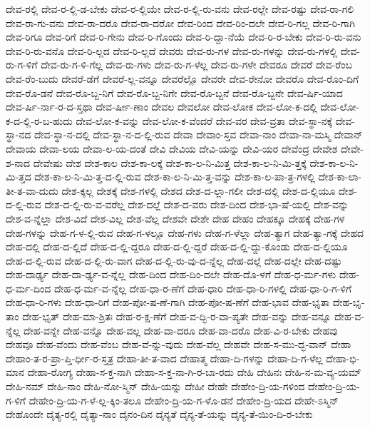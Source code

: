 {ದೇವ-ರಲ್ಲಿ
ದೇವ-ರ-ಲ್ಲಿ-ಡ-ಬೇಕು
ದೇವ-ರ-ಲ್ಲಿಯೇ
ದೇವ-ರ-ಲ್ಲಿ-ರು-ವನು
ದೇವ-ರಲ್ಲೇ
ದೇವ-ರಷ್ಟು
ದೇವ-ರಾ-ಗಲಿ
ದೇವ-ರಾ-ಗು-ವನು
ದೇವ-ರಾ-ದರೊ
ದೇವ-ರಾ-ದರೋ
ದೇವ-ರಿಂದ
ದೇವ-ರಿಂ-ದಲೇ
ದೇವ-ರಿ-ಗಲ್ಲ
ದೇವ-ರಿ-ಗಾಗಿ
ದೇವ-ರಿಗೂ
ದೇವ-ರಿಗೆ
ದೇವ-ರಿ-ಗೇನು
ದೇವ-ರಿ-ಗೊಂದು
ದೇವ-ರಿ-ದ್ದಾ-ನೆಯೆ
ದೇವ-ರಿ-ರ-ಬೇಕು
ದೇವ-ರಿ-ರು-ವನು
ದೇವ-ರಿ-ರು-ವನೊ
ದೇವ-ರಿ-ಲ್ಲದ
ದೇವ-ರಿ-ಲ್ಲದೆ
ದೇವರು
ದೇವ-ರು-ಗಳ
ದೇವ-ರು-ಗಳನ್ನು
ದೇವ-ರು-ಗಳಲ್ಲಿ
ದೇವ-ರು-ಗ-ಳಿಗೆ
ದೇವ-ರು-ಗ-ಳಿ-ಗೆಲ್ಲ
ದೇವ-ರು-ಗಳು
ದೇವ-ರು-ಗ-ಳೆಲ್ಲ
ದೇವ-ರು-ಗಳೇ
ದೇವರೂ
ದೇವರೆ
ದೇವ-ರೆಂಬ
ದೇವ-ರೆಂ-ಬುದು
ದೇವರೆ-ಡೆಗೆ
ದೇವರೆ-ಲ್ಲ-ವನ್ನೂ
ದೇವರೆಲ್ಲೊ
ದೇವರೇ
ದೇವ-ರೇನೋ
ದೇವರೊ
ದೇವ-ರೊಂ-ದಿಗೆ
ದೇವ-ರೊ-ಡನೆ
ದೇವ-ರೊ-ಬ್ಬ-ನಿಗೆ
ದೇವ-ರೊ-ಬ್ಬ-ನಿಗೇ
ದೇವ-ರೊ-ಬ್ಬನೆ
ದೇವ-ರೊ-ಬ್ಬನೇ
ದೇವ-ರ್ಷಿ-ಯಾದ
ದೇವ-ರ್ಷಿ-ರ್ನಾ-ರ-ದ-ಸ್ತಥಾ
ದೇವ-ರ್ಷೀ-ಣಾಂ
ದೇವಲ
ದೇವಲೋ
ದೇವ-ಲೋಕ
ದೇವ-ಲೋ-ಕ-ದಲ್ಲಿ
ದೇವ-ಲೋ-ಕ-ದ-ಲ್ಲಿ-ರ-ಬ-ಹುದು
ದೇವ-ಲೋ-ಕ-ವನ್ನು
ದೇವ-ಲೋ-ಕ-ವೆಂದರೆ
ದೇವ-ವರ
ದೇವ-ವ್ರತಾ
ದೇವ-ಸ್ಥಾ-ನಕ್ಕೆ
ದೇವ-ಸ್ಥಾ-ನದ
ದೇವ-ಸ್ಥಾ-ನ-ದಲ್ಲಿ
ದೇವ-ಸ್ಥಾ-ನ-ದ-ಲ್ಲಿ-ರುವ
ದೇವಾ
ದೇವಾಂ-ಸ್ತವ
ದೇವಾ-ನಾಂ
ದೇವಾ-ನಾ-ಮಸ್ಮಿ
ದೇವಾನ್
ದೇವಾಯ
ದೇವಾ-ಲಯ
ದೇವಾ-ಲ-ಯ-ದಂತೆ
ದೇವಿ
ದೇವಿಯ
ದೇವಿ-ಯನ್ನು
ದೇವಿ-ಯರ
ದೇವೆಂದ್ರ
ದೇವೇಶ
ದೇವೇ-ಶ-ನಾದ
ದೇವೇಷು
ದೇಶ
ದೇಶ-ಕಾಲ
ದೇಶ-ಕಾ-ಲಕ್ಕೆ
ದೇಶ-ಕಾ-ಲ-ನಿ-ಮಿತ್ತ
ದೇಶ-ಕಾ-ಲ-ನಿ-ಮಿ-ತ್ತಕ್ಕೆ
ದೇಶ-ಕಾ-ಲ-ನಿ-ಮಿ-ತ್ತದ
ದೇಶ-ಕಾ-ಲ-ನಿ-ಮಿ-ತ್ತ-ದ-ಲ್ಲಿ-ರುವ
ದೇಶ-ಕಾ-ಲ-ನಿ-ಮಿ-ತ್ತ-ವನ್ನು
ದೇಶ-ಕಾ-ಲ-ಪಾ-ತ್ರ-ಗಳಲ್ಲಿ
ದೇಶ-ಕಾ-ಲಾ-ತೀ-ತ-ವಾ-ದುದು
ದೇಶ-ಕ್ಕಲ್ಲ
ದೇಶಕ್ಕೆ
ದೇಶ-ಗಳಲ್ಲಿ
ದೇಶದ
ದೇಶ-ದ-ಲ್ಲಾ-ಗಲೀ
ದೇಶ-ದಲ್ಲಿ
ದೇಶ-ದ-ಲ್ಲಿಯೂ
ದೇಶ-ದ-ಲ್ಲಿ-ರುವ
ದೇಶ-ದ-ಲ್ಲಿ-ರು-ವ-ವರೆಲ್ಲ
ದೇಶ-ದಲ್ಲೆ
ದೇಶ-ದ-ವರು
ದೇಶ-ದಿಂದ
ದೇಶ-ಭಾ-ಷೆ-ಯಲ್ಲಿ
ದೇಶ-ವನ್ನು
ದೇಶ-ವ-ನ್ನೆಲ್ಲಾ
ದೇಶ-ವಿದೆ
ದೇಶ-ವಿಲ್ಲ
ದೇಶ-ವೆಲ್ಲ
ದೇಶವೇ
ದೇಶೇ
ದೇಹ
ದೇಹಂ
ದೇಹಕ್ಕೂ
ದೇಹಕ್ಕೆ
ದೇಹ-ಗಳ
ದೇಹ-ಗಳನ್ನು
ದೇಹ-ಗ-ಳ-ಲ್ಲಿ-ರುವ
ದೇಹ-ಗ-ಳಲ್ಲೂ
ದೇಹ-ಗಳು
ದೇಹ-ಗ-ಳೆಲ್ಲಾ
ದೇಹ-ತ್ಯಾಗ
ದೇಹ-ತ್ಯಾ-ಗಕ್ಕೆ
ದೇಹದ
ದೇಹ-ದಲ್ಲಿ
ದೇಹ-ದ-ಲ್ಲಿದೆ
ದೇಹ-ದ-ಲ್ಲಿ-ದ್ದರೂ
ದೇಹ-ದ-ಲ್ಲಿ-ದ್ದರೆ
ದೇಹ-ದ-ಲ್ಲಿ-ದ್ದು-ಕೊಂಡು
ದೇಹ-ದ-ಲ್ಲಿಯೂ
ದೇಹ-ದ-ಲ್ಲಿ-ರುವ
ದೇಹ-ದ-ಲ್ಲಿ-ರು-ವಾಗ
ದೇಹ-ದ-ಲ್ಲಿ-ರು-ವು-ದ-ನ್ನೆಲ್ಲ
ದೇಹ-ದಲ್ಲೆ
ದೇಹ-ದಲ್ಲೇ
ದೇಹ-ದಷ್ಟು
ದೇಹ-ದಾರ್ಢ್ಯ
ದೇಹ-ದಾ-ರ್ಢ್ಯ-ವ-ನ್ನೆಲ್ಲ
ದೇಹ-ದಿಂದ
ದೇಹ-ದಿಂ-ದಲೇ
ದೇಹ-ದೊ-ಳಗೆ
ದೇಹ-ಧ-ರ್ಮ-ಗಳು
ದೇಹ-ಧ-ರ್ಮ-ದಿಂದ
ದೇಹ-ಧ-ರ್ಮ-ವ-ನ್ನೆಲ್ಲ
ದೇಹ-ಧಾ-ರ-ಣೆಗೆ
ದೇಹ-ಧಾರಿ
ದೇಹ-ಧಾ-ರಿ-ಗಳಲ್ಲಿ
ದೇಹ-ಧಾ-ರಿ-ಗ-ಳಿಗೆ
ದೇಹ-ಧಾ-ರಿ-ಗಳು
ದೇಹ-ಧಾ-ರಿಗೆ
ದೇಹ-ಪೋ-ಷ-ಣೆ-ಗಾಗಿ
ದೇಹ-ಪೋ-ಷ-ಣೆಗೆ
ದೇಹ-ಭಾವ
ದೇಹ-ಭೃತಾ
ದೇಹ-ಭೃ-ತಾಂ
ದೇಹ-ಭೃತ್
ದೇಹ-ಮಾ-ಶ್ರಿತಃ
ದೇಹ-ರ-ಕ್ಷ-ಣೆಗೆ
ದೇಹ-ವ-ದ್ಭಿ-ರ-ವಾ-ಪ್ಯತೇ
ದೇಹ-ವನ್ನು
ದೇಹ-ವನ್ನೂ
ದೇಹ-ವ-ನ್ನೆಲ್ಲ
ದೇಹ-ವನ್ನೇ
ದೇಹ-ವನ್ನೊ
ದೇಹ-ವಲ್ಲ
ದೇಹ-ವಾ-ದರೂ
ದೇಹ-ವಾ-ದರೊ
ದೇಹ-ವಿ-ರ-ಬೇಕು
ದೇಹವು
ದೇಹವೂ
ದೇಹ-ವೆಂದು
ದೇಹ-ವೆಂಬ
ದೇಹ-ವೆ-ನ್ನು-ವುದು
ದೇಹ-ವೆಲ್ಲ
ದೇಹವೇ
ದೇಹ-ಸ-ಮು-ದ್ಭ-ವಾನ್
ದೇಹಾ
ದೇಹಾಂ-ತ-ರ-ಪ್ರಾ-ಪ್ತಿ-ರ್ಧೀ-ರ-ಸ್ತತ್ರ
ದೇಹಾ-ತೀ-ತ-ವಾದ
ದೇಹಾತ್ಮ
ದೇಹಾ-ದಿ-ಗಳನ್ನು
ದೇಹಾ-ದಿ-ಗ-ಳೆಲ್ಲ
ದೇಹಾ-ಭಿ-ಮಾನ
ದೇಹಾ-ರೋಗ್ಯ
ದೇಹಾ-ಸ-ಕ್ತ-ನಾಗಿ
ದೇಹಾ-ಸ-ಕ್ತ-ನಾ-ಗಿ-ರ-ಬಾ-ರದು
ದೇಹಿ
ದೇಹಿನಃ
ದೇಹಿ-ನ-ಮ-ವ್ಯ-ಯಮ್
ದೇಹಿ-ನಮ್
ದೇಹಿ-ನಾಂ
ದೇಹಿ-ನೋ-ಸ್ಮಿನ್
ದೇಹಿ-ಯನ್ನು
ದೇಹೀ
ದೇಹೇ
ದೇಹೇಂ-ದ್ರಿ-ಯ-ಗಳಿಂದ
ದೇಹೇಂ-ದ್ರಿ-ಯ-ಗ-ಳಿಗೆ
ದೇಹೇಂ-ದ್ರಿ-ಯ-ಗ-ಳೆ-ಲ್ಲ-ಕ್ಕಿಂ-ತಲೂ
ದೇಹೇಂ-ದ್ರಿ-ಯ-ಗ-ಳೊ-ಡನೆ
ದೇಹೇಂ-ದ್ರಿ-ಯದ
ದೇಹೇ-ಽಸ್ಮಿನ್
ದೇಹೊಂದೇ
ದೈತ್ಯ-ರಲ್ಲಿ
ದೈತ್ಯಾ-ನಾಂ
ದೈನಂ-ದಿನ
ದೈನ್ಯತೆ
ದೈನ್ಯ-ತೆ-ಯನ್ನು
ದೈನ್ಯ-ತೆ-ಯಿಂ-ದಿ-ರ-ಬೇಕು
}
